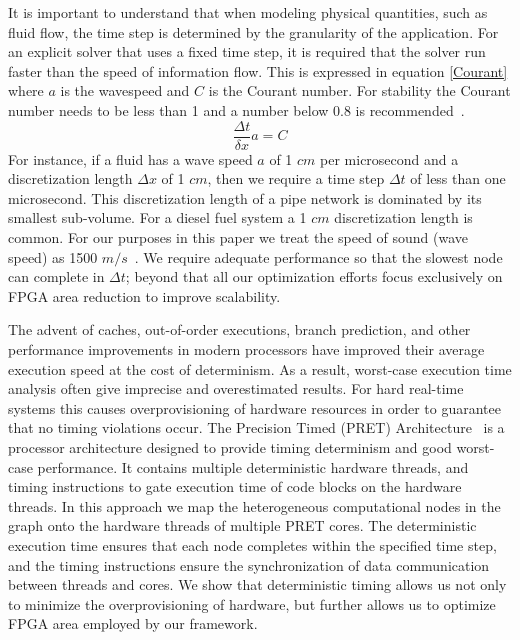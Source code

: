         It is important to understand that when modeling physical quantities, such as fluid flow, the time step is determined by the granularity of the application.  
        For an explicit solver that uses a fixed time step, it is required that the solver run faster than the speed of information flow. 
        This is expressed in equation \ref{Courant} where \(a\) is the wavespeed and \(C\) is the Courant number.  For stability the Courant number needs to be less than 1 and a number below 0.8 is recommended~\cite{GTFuel}.
\begin{equation} \label{Courant}
\frac{\Delta t}{\delta x}a = C
\end{equation}
  For instance, if a fluid has a wave speed \(a\) of 1 $cm$ per microsecond and a discretization length \(\Delta x\) of 1 $cm$, then we require a time step \(\Delta t\) of less than one microsecond.  
  This discretization length of a pipe network is dominated by its smallest sub-volume.
  For a diesel fuel system a 1 $cm$ discretization length is common.
For our purposes in this paper we treat the speed of sound (wave speed) as 1500 $m/s$~\cite{DieselSpeedOfSound}.
We require adequate performance so that the slowest node can complete in \(\Delta t\); beyond that all our optimization efforts focus exclusively on FPGA area reduction to improve scalability.

	The advent of caches, out-of-order executions, branch prediction, and other performance improvements in modern processors have improved their average execution speed at the cost of determinism.  
        As a result, worst-case execution time analysis often give imprecise and overestimated results. 
        For hard real-time systems this causes overprovisioning of hardware resources in order to guarantee that no timing violations occur. 
        The Precision Timed (PRET) Architecture~\cite{pret_cases08} is a processor architecture designed to provide timing determinism and good worst-case performance. 
        It contains multiple deterministic hardware threads, and timing instructions to gate execution time of code blocks on the hardware threads. 
        In this approach we map the heterogeneous computational nodes in the graph onto the hardware threads of multiple PRET cores. 
        The deterministic execution time ensures that each node completes within the specified time step, and the timing instructions ensure the synchronization of data communication between threads and cores.
        We show that deterministic timing allows us not only to minimize the overprovisioning of hardware, but further allows us to optimize FPGA area employed by our framework.

